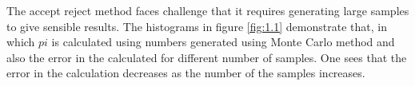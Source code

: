 The accept reject method faces challenge that it requires generating large samples to give sensible results. The histograms in figure \ref{fig:1.1} demonstrate that, in which $pi$ is calculated using numbers generated using Monte Carlo method and also the error in the calculated for different number of samples.     
One sees that the error in the calculation decreases as the number of the samples increases.

 





